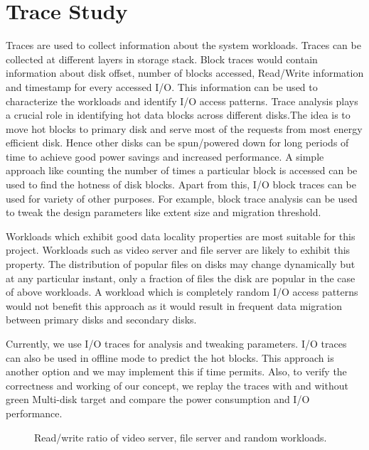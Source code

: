 \section{Trace Study}
\label{sec:trace}

Traces are used to collect information about the system workloads.
Traces can be collected at different layers in storage stack. Block
traces would contain information about disk offset, number of blocks
accessed, Read/Write information and timestamp for every accessed I/O.
This information can be used to characterize the workloads and
identify I/O access patterns.  Trace analysis plays a crucial role in
identifying hot data blocks across different disks.The idea is to move
hot blocks to primary disk and serve most of the requests from most
energy efficient disk. Hence other disks can be spun/powered down for
long periods of time to achieve good power savings and increased
performance. A simple approach like counting the number of times a
particular block is accessed can be used to find the hotness of disk
blocks. Apart from this, I/O block traces can be used for variety of
other purposes.  For example, block trace analysis can be used to
tweak the design parameters like extent size and migration threshold.

Workloads which exhibit good data locality properties are most
suitable for this project. Workloads such as video server and file
server are likely to exhibit this property. The distribution of
popular files on disks may change dynamically but at any particular
instant, only a fraction of files the disk are popular in the case of
above workloads.  A workload which is completely random I/O access
patterns would not benefit this approach as it would result in
frequent data migration between primary disks and secondary disks.
 
Currently, we use I/O traces for analysis and tweaking parameters. I/O
traces can also be used in offline mode to predict the hot blocks.
This approach is another option and we may implement this if time
permits. Also, to verify the correctness and working of our concept,
we replay the traces with and without green Multi-disk target and
compare the power consumption and I/O performance. 

\begin{figure}[ht]
\begin{centering}
\caption{Read/write ratio of video server, file server and random
  workloads.}
\label{fig:rwratio}
\end{centering}
\end{figure}

